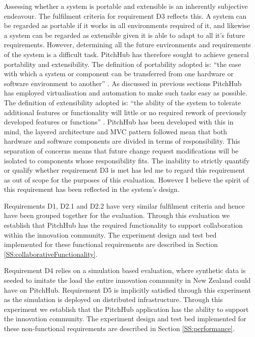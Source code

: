 Assessing whether a system is portable and extensible is an inherently subjective endeavour. The fulfilment criteria for requirement D3 reflects this. A system can be regarded as portable if it works in all environments required of it, and likewise a system can be regarded as extensible given it is able to adapt to all it's future requirements. However, determining all the future environments and requirements of the system is a difficult task. PitchHub has therefore sought to achieve general portability and extensibility. The definition of portability adopted is: ``the ease with which a system or component can be transferred from one hardware or software environment to another'' \cite{mattsson2006software}. As discussed in previous sections PitchHub has employed virtualisation and automation to make such tasks easy as possible. The definition of extensibility adopted is: ``the ability of the system to tolerate additional features or functionality will little or no required rework of previously developed features or functions'' \cite{Extensibility:online}. PitchHub has been developed with this in mind, the layered architecture and MVC pattern followed mean that both hardware and software components are divided in terms of responsibility. This separation of concerns means that future change request modifications will be isolated to components whose responsibility fits. The inability to strictly quantify or qualify whether requirement D3 is met has led me to regard this requirement as out of scope for the purposes of this evaluation. However I believe the spirit of this requirement has been reflected in the system's design.

Requirements D1, D2.1 and D2.2 have very similar fulfilment criteria and hence have been grouped together for the evaluation. Through this evaluation we establish that PitchHub has the required functionality to support collaboration within the innovation community. The experiment design and test bed implemented for these functional requirements are described in Section \ref{SS:collaborativeFunctionality}.

Requirement D4 relies on a simulation based evaluation, where synthetic data is seeded to imitate the load the entire innovation community in New Zealand could have on PitchHub. Requirement D5 is implicitly satisfied through this experiment as the simulation is deployed on distributed infrastructure. Through this experiment we establish that the PitchHub application has the ability to support the innovation community. The experiment design and test bed implemented for these non-functional requirements are described in Section \ref{SS:performance}.

